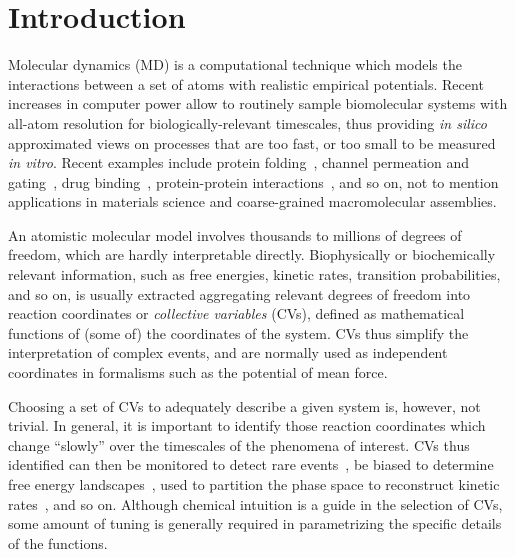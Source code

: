 \documentclass[preprint,review,11pt]{elsarticle}
\begin{document}

\section{Introduction}

Molecular dynamics (MD) is a computational technique which models the
interactions between a set of atoms with realistic empirical
potentials. Recent increases in computer power allow to routinely
sample biomolecular systems with all-atom resolution for
biologically-relevant timescales, thus providing \emph{in silico}
approximated views on processes that are too fast, or too small to be
measured \emph{in vitro}. Recent examples include protein
folding~\cite{Lindorff-Larsen_Piana_Dror_Shaw_2011}, channel
permeation and
gating~\cite{Jensen_Jogini_Borhani_Leffler_Dror_Shaw_2012}, drug
binding~\cite{Shan_Kim_Eastwood_Dror_Seeliger_Shaw_2011,Buch_Giorgino_2011},
protein-protein
interactions~\cite{Ahmad_Gu_Helms_2008,Giorgino_Buch_2012}, and so on,
not to mention applications in materials science and coarse-grained
macromolecular assemblies.

An atomistic molecular model involves thousands to millions of degrees
of freedom, which are hardly interpretable directly. Biophysically or
biochemically relevant information, such as free energies, kinetic
rates, transition probabilities, and so on,  is usually extracted
aggregating relevant degrees of freedom into reaction coordinates or
\emph{collective variables} (CVs), defined as mathematical functions of (some
of) the coordinates of the system.  CVs thus  simplify the
interpretation of complex events, and are normally used as independent
coordinates in formalisms such as the potential of mean force.

Choosing a set of CVs to adequately describe a given system is,
however, not trivial. In general, it is important to identify those
reaction coordinates which change ``slowly'' over the timescales of
the phenomena of interest. CVs thus identified can then be monitored
to detect rare events~\cite{Giorgino_Buch_2012}, be biased to
determine free energy landscapes~\cite{Laio_Parrinello_2002},  used
to partition the phase space to reconstruct
kinetic rates~\cite{Biarnes_Pietrucci_Marinelli_Laio_2012,Noe_Fischer_2008},
and so on.  Although chemical intuition is a guide in the selection of
CVs, some amount of tuning is generally required in parametrizing the
specific details of the functions.
\end{document}
